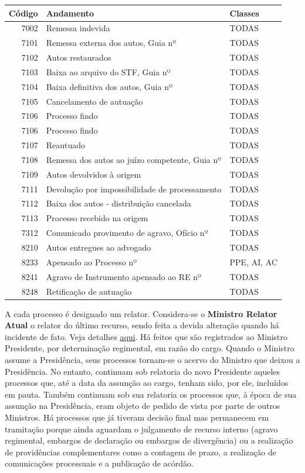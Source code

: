 \documentclass[
]{book}
\begin{document}
\begin{tabular}{r|l|l}
\hline
Código & Andamento & Classes\\
\hline
7002 & Remessa indevida & TODAS\\
\hline
7101 & Remessa externa dos autos, Guia nº & TODAS\\
\hline
7102 & Autos restaurados & TODAS\\
\hline
7103 & Baixa ao arquivo do STF, Guia nº & TODAS\\
\hline
7104 & Baixa definitiva dos autos, Guia nº & TODAS\\
\hline
7105 & Cancelamento de autuação & TODAS\\
\hline
7106 & Processo findo & TODAS\\
\hline
7106 & Processo findo & TODAS\\
\hline
7107 & Reautuado & TODAS\\
\hline
7108 & Remessa dos autos ao juízo competente, Guia nº & TODAS\\
\hline
7109 & Autos devolvidos à origem & TODAS\\
\hline
7111 & Devolução por impossibilidade de processamento & TODAS\\
\hline
7112 & Baixa dos autos - distribuição cancelada & TODAS\\
\hline
7113 & Processo recebido na origem & TODAS\\
\hline
7312 & Comunicado provimento de agravo, Ofício nº & TODAS\\
\hline
8210 & Autos entregues ao advogado & TODAS\\
\hline
8233 & Apensado ao Processo nº & PPE, AI, AC\\
\hline
8241 & Agravo de Instrumento apensado ao RE nº & TODAS\\
\hline
8248 & Retificação de autuação & TODAS\\
\hline
\end{tabular}

A cada processo é designado um relator. Considera-se o \textbf{Ministro Relator Atual} o relator do último recurso, sendo feita a devida alteração quando há incidente de fato. Veja detalhes \protect\hyperlink{regra-relatoria}{aqui}.
Há feitos que são registrados ao Ministro Presidente, por determinação regimental, em razão do cargo. Quando o Ministro assume a Presidência, seus processos tornam-se o acervo do Ministro que deixou a Presidência. No entanto, continuam sob relatoria do novo Presidente aqueles processos que, até a data da assunção ao cargo, tenham sido, por ele, incluídos em pauta. Também continuam sob sua relatoria os processos que, à época de sua assunção na Presidência, eram objeto de pedido de vista por parte de outros Ministros.
Há processos que já tiveram decisão final mas permanecem em tramitação porque ainda aguardam o julgamento de recurso interno (agravo regimental, embargos de declaração ou embargos de divergência) ou a realização de providências complementares como a contagem de prazo, a realização de comunicações processuais e a publicação de acórdão.
\end{document}
